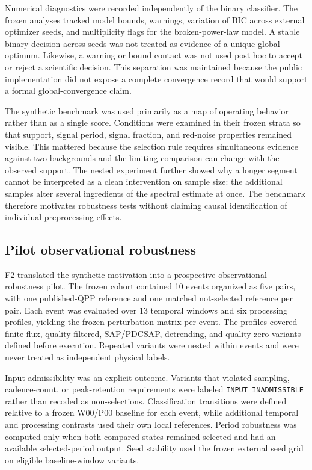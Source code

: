 \documentclass[11pt,a4paper]{article}
\begin{document}
Numerical diagnostics were recorded independently of the binary classifier. The frozen analyses tracked model bounds, warnings, variation of BIC across external optimizer seeds, and multiplicity flags for the broken-power-law model. A stable binary decision across seeds was not treated as evidence of a unique global optimum. Likewise, a warning or bound contact was not used post hoc to accept or reject a scientific decision. This separation was maintained because the public implementation did not expose a complete convergence record that would support a formal global-convergence claim.

The synthetic benchmark was used primarily as a map of operating behavior rather than as a single score. Conditions were examined in their frozen strata so that support, signal period, signal fraction, and red-noise properties remained visible. This mattered because the selection rule requires simultaneous evidence against two backgrounds and the limiting comparison can change with the observed support. The nested experiment further showed why a longer segment cannot be interpreted as a clean intervention on sample size: the additional samples alter several ingredients of the spectral estimate at once. The benchmark therefore motivates robustness tests without claiming causal identification of individual preprocessing effects.

\subsection{Pilot observational robustness}
F2 translated the synthetic motivation into a prospective observational robustness pilot. The frozen cohort contained 10 events organized as five pairs, with one published-QPP reference and one matched not-selected reference per pair. Each event was evaluated over 13 temporal windows and six processing profiles, yielding the frozen perturbation matrix per event. The profiles covered finite-flux, quality-filtered, SAP/PDCSAP, detrending, and quality-zero variants defined before execution. Repeated variants were nested within events and were never treated as independent physical labels.

Input admissibility was an explicit outcome. Variants that violated sampling, cadence-count, or peak-retention requirements were labeled \texttt{INPUT\_INADMISSIBLE} rather than recoded as non-selections. Classification transitions were defined relative to a frozen W00/P00 baseline for each event, while additional temporal and processing contrasts used their own local references. Period robustness was computed only when both compared states remained selected and had an available selected-period output. Seed stability used the frozen external seed grid on eligible baseline-window variants.
\end{document}
